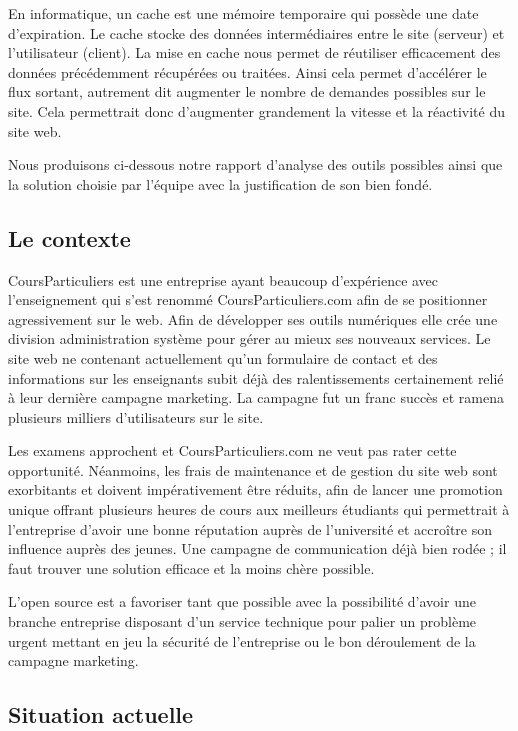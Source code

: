 \documentclass{article}
\begin{document}
En informatique, un cache est une mémoire temporaire qui possède une date d'expiration. Le cache stocke des données intermédiaires entre le site (serveur) et l'utilisateur (client). La mise en cache nous permet de réutiliser efficacement des données précédemment récupérées ou traitées. Ainsi cela permet d'accélérer le flux sortant, autrement dit augmenter le nombre de demandes possibles sur le site. 
Cela permettrait donc d'augmenter grandement la vitesse et la réactivité du site web. 

Nous produisons ci-dessous notre rapport d'analyse des outils possibles ainsi que la solution choisie par l'équipe avec la justification de son bien fondé.

\subsection{Le contexte}

CoursParticuliers est une entreprise ayant beaucoup d'expérience avec l'enseignement qui s'est renommé CoursParticuliers.com afin de se positionner agressivement sur le web. Afin de développer ses outils numériques elle crée une division administration système pour gérer au mieux ses nouveaux services.
Le site web ne contenant actuellement qu'un formulaire de contact et des informations sur les enseignants subit déjà des ralentissements certainement relié à leur dernière campagne marketing. 
La campagne fut un franc succès et ramena plusieurs milliers d'utilisateurs sur le site.

Les examens approchent et CoursParticuliers.com ne veut pas rater cette opportunité. Néanmoins, les frais de maintenance et de gestion du site web sont exorbitants et doivent impérativement être réduits, afin de lancer une promotion unique offrant plusieurs heures de cours aux meilleurs étudiants qui permettrait à l'entreprise d'avoir une bonne réputation auprès de l'université et accroître son influence auprès des jeunes.
Une campagne de communication déjà bien rodée ; il faut trouver une solution efficace et la moins chère possible. 

L'open source est a favoriser tant que possible avec la possibilité d'avoir une branche entreprise disposant d'un service technique pour palier un problème urgent mettant en jeu la sécurité de l'entreprise ou le bon déroulement de la campagne marketing.

\subsection{Situation actuelle}
\end{document}
